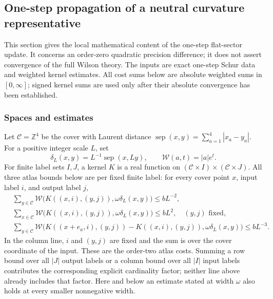 \subsection{One-step propagation of a neutral curvature representative}
\label{sec:ex-lattice-flat-step}

This section gives the local mathematical content of the one-step flat-sector
update. It concerns an order-zero quadratic precision difference; it does not
assert convergence of the full Wilson theory. The inputs are exact one-step
Schur data and weighted kernel estimates. All cost sums below are absolute weighted sums in $[0,\infty]$; signed
kernel sums are used only after their absolute convergence has been established.

\subsubsection{Spaces and estimates}

Let $\mathcal C=\mathbb Z^4$ be the cover with Laurent distance
$\operatorname{sep}(x,y)=\sum_{a=1}^4|x_a-y_a|$. For a positive integer scale
$L$, set
\[
 \delta_L(x,y)=L^{-1}\operatorname{sep}(x,Ly),\qquad
 \mathcal W(a,t)=|a|e^t.
\]
For finite label sets $I,J$, a kernel $K$ is a real function on
$(\mathcal C\times I)\times(\mathcal C\times J)$. All three atlas
bounds below are per fixed finite label: for every cover point $x$, input label
$i$, and output label $j$,
\begin{align}
 &\sum_{y\in\mathcal C}\mathcal W
   \bigl(K((x,i),(y,j)),\omega\delta_L(x,y)\bigr)\leq bL^{-2},\label{eq:ex-lattice-flat-step-row}\\
 &\sum_{x\in\mathcal C}\mathcal W
   \bigl(K((x,i),(y,j)),\omega\delta_L(x,y)\bigr)\leq bL^2,
   \quad (y,j)\text{ fixed},\label{eq:ex-lattice-flat-step-column}\\
 &\sum_{y\in\mathcal C}\mathcal W
   \bigl(K((x+e_a,i),(y,j))-K((x,i),(y,j)),\omega\delta_L(x,y)\bigr)\leq bL^{-3}.
   \label{eq:ex-lattice-flat-step-difference}
\end{align}
In the column line, $i$ and $(y,j)$ are fixed and the sum is over the cover
coordinate of the input. These are the order-two atlas costs. Summing a row
bound over all $|J|$ output labels or a column bound over all $|I|$ input
labels contributes the corresponding explicit cardinality factor; neither
line above already includes that factor. Here and below an estimate stated at
width $\omega$ also holds at every smaller nonnegative width.

